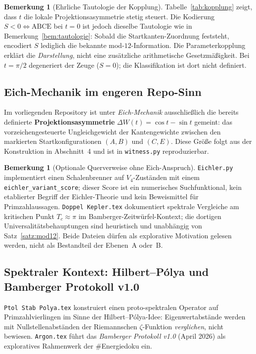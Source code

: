\documentclass[11pt,a4paper]{article}
\theoremstyle{definition}
\newtheorem{bemerkung}[definition]{Bemerkung}
\theoremstyle{plain}
\begin{document}
	\begin{bemerkung}[Ehrliche Tautologie der Kopplung]
		Tabelle~\ref{tab:kopplung} zeigt, dass $t$ die lokale Projektionsasymmetrie stetig steuert. Die Kodierung $S<0\Leftrightarrow\mathrm{ABCE}$ bei $t=0$ ist jedoch dieselbe Tautologie wie in Bemerkung~\ref{bem:tautologie}: Sobald die Startkanten-Zuordnung feststeht, encodiert $S$ lediglich die bekannte mod-$12$-Information. Die Parameterkopplung erklärt die \emph{Darstellung}, nicht eine zusätzliche arithmetische Gesetzmäßigkeit. Bei $t=\pi/2$ degeneriert der Zeuge ($S=0$); die Klassifikation ist dort nicht definiert.
	\end{bemerkung}
	
	\subsection{Eich-Mechanik im engeren Repo-Sinn}
	
	Im vorliegenden Repository ist unter \emph{Eich-Mechanik} ausschließlich die bereits definierte \textbf{Projektionsasymmetrie} $\Delta W(t)=\cos t-\sin t$ gemeint: das vorzeichengesteuerte Ungleichgewicht der Kantengewichte zwischen den markierten Startkonfigurationen $(A,B)$ und $(C,E)$. Diese Größe folgt aus der Konstruktion in Abschnitt~4 und ist in \texttt{witness.py} reproduzierbar.
	
	\begin{bemerkung}[Optionale Querverweise ohne Eich-Anspruch]
		\texttt{Eichler.py} implementiert einen Schalenbrenner auf $V_4$-Zuständen mit einem \texttt{eichler\_variant\_score}; dieser Score ist ein numerisches Suchfunktional, kein etablierter Begriff der Eichler-Theorie und kein Beweismittel für Primzahlaussagen. \texttt{Doppel Kepler.tex} dokumentiert spektrale Vergleiche am kritischen Punkt $T_c\approx\pi$ im Bamberger-Zeitwürfel-Kontext; die dortigen Universalitätsbehauptungen sind heuristisch und unabhängig von Satz~\ref{satz:mod12}. Beide Dateien dürfen als explorative Motivation gelesen werden, nicht als Bestandteil der Ebenen~A oder~B.
	\end{bemerkung}
	
	\subsection{Spektraler Kontext: Hilbert--Pólya und Bamberger Protokoll v1.0}
	
	\texttt{Ptol Stab Polya.tex} konstruiert einen proto-spektralen Operator auf Primzahlvierlingen im Sinne der Hilbert--Pólya-Idee: Eigenwertabstände werden mit Nullstellenabständen der Riemannschen $\zeta$-Funktion \emph{verglichen}, nicht bewiesen. \texttt{Argon.tex} führt das \emph{Bamberger Protokoll v1.0} (April 2026) als exploratives Rahmenwerk der \#Energiedoku ein.
	
\end{document}
